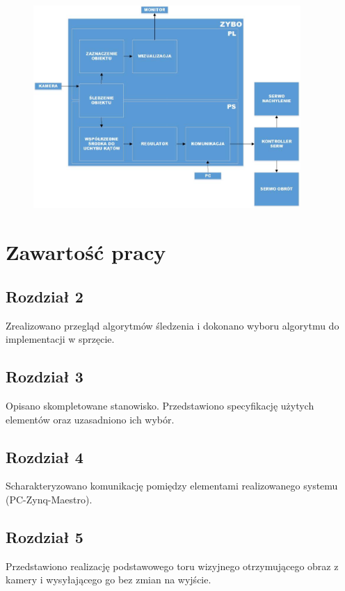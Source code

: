 \begin{figure}[h]
	\centering
	\includegraphics[width=4in]{scheme_pol.jpg}
	\label{fig:schemat}
\end{figure}

\section{Zawartość pracy}
\label{sec:zawartoscpracy}

\subsection{Rozdział 2}
Zrealizowano przegląd algorytmów śledzenia i dokonano wyboru algorytmu do implementacji w sprzęcie.

\subsection{Rozdział 3}
Opisano skompletowane stanowisko. Przedstawiono specyfikację użytych elementów oraz uzasadniono ich wybór.

\subsection{Rozdział 4}
Scharakteryzowano komunikację pomiędzy elementami realizowanego systemu (PC-Zynq-Maestro).

\subsection{Rozdział 5}
Przedstawiono realizację podstawowego toru wizyjnego otrzymującego obraz z kamery i wysyłającego go bez zmian na wyjście.


